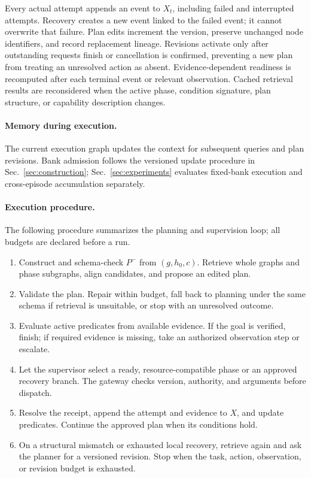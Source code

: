 \documentclass[10pt,twocolumn,letterpaper]{article}
\begin{document}
Every actual attempt appends an event to $X_t$, including failed and interrupted attempts. Recovery creates a new event linked to the failed event; it cannot overwrite that failure. Plan edits increment the version, preserve unchanged node identifiers, and record replacement lineage. Revisions activate only after outstanding requests finish or cancellation is confirmed, preventing a new plan from treating an unresolved action as absent. Evidence-dependent readiness is recomputed after each terminal event or relevant observation. Cached retrieval results are reconsidered when the active phase, condition signature, plan structure, or capability description changes.

\paragraph{Memory during execution.}
The current execution graph updates the context for subsequent queries and plan revisions. Bank admission follows the versioned update procedure in Sec.~\ref{sec:construction}; Sec.~\ref{sec:experiments} evaluates fixed-bank execution and cross-episode accumulation separately.

\paragraph{Execution procedure.}
The following procedure summarizes the planning and supervision loop; all budgets are declared before a run.
\begin{enumerate}
\item Construct and schema-check $P^{-}$ from $(g,h_0,c)$. Retrieve whole graphs and phase subgraphs, align candidates, and propose an edited plan.
\item Validate the plan. Repair within budget, fall back to planning under the same schema if retrieval is unsuitable, or stop with an unresolved outcome.
\item Evaluate active predicates from available evidence. If the goal is verified, finish; if required evidence is missing, take an authorized observation step or escalate.
\item Let the supervisor select a ready, resource-compatible phase or an approved recovery branch. The gateway checks version, authority, and arguments before dispatch.
\item Resolve the receipt, append the attempt and evidence to $X$, and update predicates. Continue the approved plan when its conditions hold.
\item On a structural mismatch or exhausted local recovery, retrieve again and ask the planner for a versioned revision. Stop when the task, action, observation, or revision budget is exhausted.
\end{enumerate}
\end{document}
